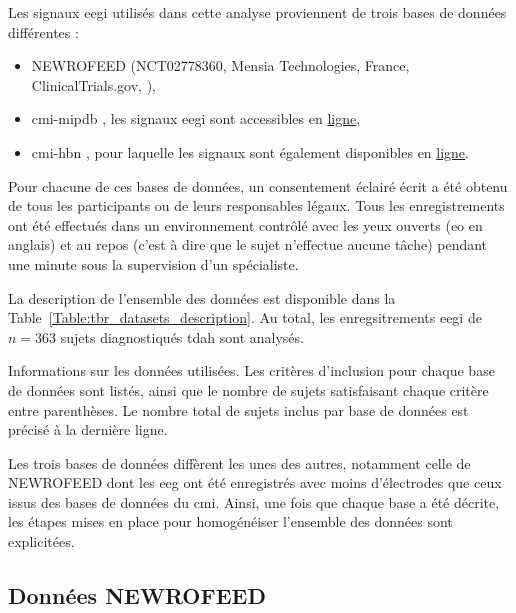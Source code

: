 Les signaux \gls{eegi} utilisés dans cette analyse proviennent de trois bases de données différentes :
\begin{itemize}
\item NEWROFEED (NCT02778360, Mensia Technologies, France, ClinicalTrials.gov, \citet{Bioulac2019}),
\item \gls{cmi-mipdb} \citep{Langer2017, Langer2017b}, les signaux \gls{eegi} sont accessibles en \href{http://fcon_1000.projects.nitrc.org/indi/cmi_eeg/eeg.html}{ligne},
\item \gls{cmi-hbn} \citep{Alexander2017, Alexander2017b}, pour laquelle les signaux sont également disponibles en 
\href{http://fcon_1000.projects.nitrc.org/indi/cmi_healthy_brain_network/sharing_neuro.html}{ligne}.
\end{itemize}
Pour chacune de ces bases de données, un consentement éclairé écrit a été obtenu de tous les participants ou de leurs responsables légaux. Tous les enregistrements
ont été effectués dans un environnement contrôlé avec les yeux ouverts (\gls{eo} en anglais) et au repos (c'est à dire que le sujet n'effectue aucune tâche) 
pendant une minute sous la supervision d'un spécialiste. 

La description de l'ensemble des données est disponible dans la Table~\ref{Table:tbr_datasets_description}. Au total, les enregsitrements \gls{eegi} de 
$n = 363$ sujets diagnostiqués \gls{tdah} sont analysés.

\begin{table}[h!]
  \centering
  \caption[Informations sur les données utilisées.]{Informations sur les données utilisées. Les critères d'inclusion pour chaque base de données sont listés, ainsi que le nombre de sujets satisfaisant
	chaque critère entre parenthèses. Le nombre total de sujets inclus par base de données est précisé à la dernière ligne.}
  
  \label{Table:tbr_datasets_description}
\end{table}

Les trois bases de données diffèrent les unes des autres, notamment celle de NEWROFEED dont les \gls{eeg} ont été enregistrés avec moins d'électrodes 
que ceux issus des bases de données du \gls{cmi}. Ainsi, une fois que chaque base a été décrite, les étapes
mises en place pour homogénéiser l'ensemble des données sont explicitées.

\subsection{Données NEWROFEED}

